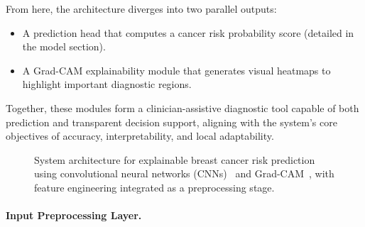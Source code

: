 \documentclass[12pt]{article}
\begin{document}
From here, the architecture diverges into two parallel outputs:
\begin{itemize}
    \item A prediction head that computes a cancer risk probability score (detailed in the model section).
    \item A Grad-CAM explainability module that generates visual heatmaps to highlight important diagnostic regions.
\end{itemize}

Together, these modules form a clinician-assistive diagnostic tool capable of both prediction and transparent decision support, aligning with the system’s core objectives of accuracy, interpretability, and local adaptability.

\begin{figure}[H]
    \centering
    \caption{System architecture for explainable breast cancer risk prediction using convolutional neural networks (CNNs)~\cite{1} and Grad-CAM~\cite{5}, with feature engineering integrated as a preprocessing stage.}
    \label{fig:system_architecture}
\end{figure}

\paragraph{Input Preprocessing Layer.}
\end{document}
